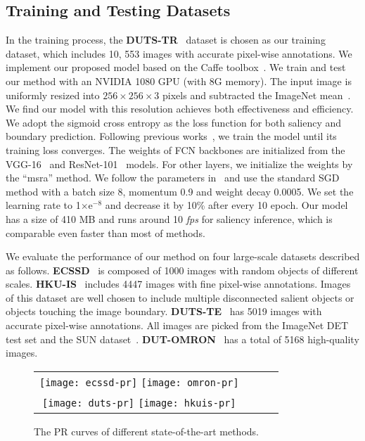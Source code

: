 \documentclass[journal]{IEEEtran}
\begin{document}
\subsection{Training and Testing Datasets}
\label{Dataset}
In the training process, the \textbf{DUTS-TR}~\cite{Lijun2017Learning} dataset is chosen as our training dataset, which includes 10, 553 images with accurate pixel-wise annotations.
We implement our proposed model based on the Caffe toolbox~\cite{jia2014caffe}.
We train and test our method with an NVIDIA 1080 GPU (with 8G memory).
The input image is uniformly resized into $256\times256\times3$ pixels and subtracted the ImageNet mean~\cite{deng2009imagenet}.
We find our model with this resolution achieves both effectiveness and efficiency.
We adopt the sigmoid cross entropy as the loss function for both saliency and boundary prediction.
Following previous works~\cite{Zhang2017Amulet,Zhang2017Learning,Zhang2018Salient}, we train the model until its training loss converges.
The weights of FCN backbones are initialized from the VGG-16~\cite{simonyan2014very} and ResNet-101~\cite{He2016Deep} models.
For other layers, we initialize the weights by the ``msra'' method.
We follow the parameters in~\cite{Zhang2017Amulet} and use the standard SGD method with a batch size 8, momentum 0.9 and weight decay 0.0005.
We set the learning rate to 1$\times$e$^{-8}$ and decrease it by 10\% after every 10 epoch.
Our model has a size of 410 MB and runs around 10 \emph{fps} for saliency inference, which is comparable even faster than most of methods.

We evaluate the performance of our method on four large-scale datasets described as follows.
\textbf{ECSSD}~\cite{Yang2013Saliency} is composed of 1000 images with random objects of different scales.
\textbf{HKU-IS}~\cite{Li2015Visual} includes 4447 images with fine pixel-wise annotations. Images of this dataset are
well chosen to include multiple disconnected salient objects or objects touching the image boundary.
\textbf{DUTS-TE}~\cite{Lijun2017Learning} has 5019 images with accurate pixel-wise annotations. All images are picked from the ImageNet DET test set and the SUN dataset~\cite{Xiao2010SUN}.
\textbf{DUT-OMRON}~\cite{Yang2013Saliency} has a total of 5168 high-quality images.
\begin{figure}[!t]
\centering
\begin{tabular}{@{}c@{}c@{}c@{}c}
\texttt{[image: ecssd-pr]}
\texttt{[image: omron-pr]}\\
\texttt{[image: duts-pr]}
\texttt{[image: hkuis-pr]}\\
\end{tabular}
 \caption{The PR curves of different state-of-the-art methods.
}
\vspace{-4mm}
\label{Fig pr}
\end{figure}
\vspace{-2mm}
\end{document}
